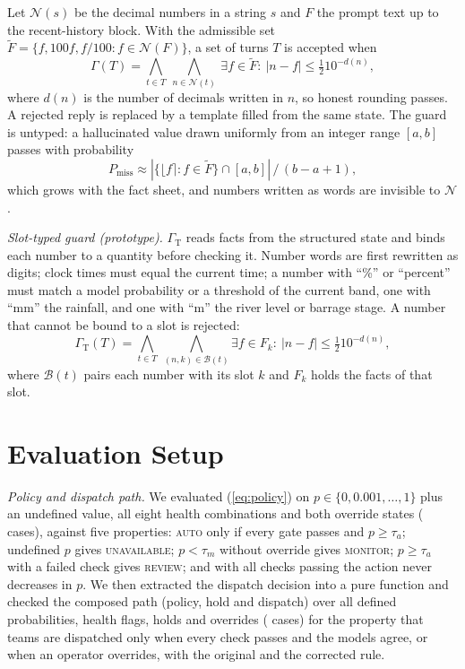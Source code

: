 \documentclass[conference]{IEEEtran}
\begin{document}
Let $\mathcal{N}(s)$ be the decimal numbers in a string $s$ and $F$ the prompt text up to the recent-history block. With the admissible set $\tilde F=\{f,100f,f/100: f\in\mathcal{N}(F)\}$, a set of turns $T$ is accepted when
\begin{equation}
\Gamma(T)=\bigwedge_{t\in T}\ \bigwedge_{n\in\mathcal{N}(t)}\ \exists f\in\tilde F:\ |n-f|\le \tfrac12 10^{-d(n)},
\label{eq:guard}
\end{equation}
where $d(n)$ is the number of decimals written in $n$, so honest rounding passes. A rejected reply is replaced by a template filled from the same state. The guard is untyped: a hallucinated value drawn uniformly from an integer range $[a,b]$ passes with probability
\begin{equation}
P_{\mathrm{miss}}\approx |\{\lfloor f\rceil : f\in\tilde F\}\cap[a,b]|\,/\,(b-a+1),
\label{eq:miss}
\end{equation}
which grows with the fact sheet, and numbers written as words are invisible to $\mathcal{N}$.

\textit{Slot-typed guard (prototype).} $\Gamma_{\mathrm{T}}$ reads facts from the structured state and binds each number to a quantity before checking it. Number words are first rewritten as digits; clock times must equal the current time; a number with ``\%'' or ``percent'' must match a model probability or a threshold of the current band, one with ``mm'' the rainfall, and one with ``m'' the river level or barrage stage. A number that cannot be bound to a slot is rejected:
\begin{equation}
\Gamma_{\mathrm{T}}(T)=\bigwedge_{t\in T}\ \bigwedge_{(n,k)\in\mathcal{B}(t)} \exists f\in F_k:\ |n-f|\le\tfrac12 10^{-d(n)},
\label{eq:typed}
\end{equation}
where $\mathcal{B}(t)$ pairs each number with its slot $k$ and $F_k$ holds the facts of that slot.

\section{Evaluation Setup}
\textit{Policy and dispatch path.} We evaluated (\ref{eq:policy}) on $p\in\{0,0.001,\dots,1\}$ plus an undefined value, all eight health combinations and both override states (\PolCases{} cases), against five properties: \textsc{auto} only if every gate passes and $p\ge\tau_a$; undefined $p$ gives \textsc{unavailable}; $p<\tau_m$ without override gives \textsc{monitor}; $p\ge\tau_a$ with a failed check gives \textsc{review}; and with all checks passing the action never decreases in $p$. We then extracted the dispatch decision into a pure function and checked the composed path (policy, hold and dispatch) over all defined probabilities, health flags, holds and overrides (\EtoECases{} cases) for the property that teams are dispatched only when every check passes and the models agree, or when an operator overrides, with the original and the corrected rule.
\end{document}
